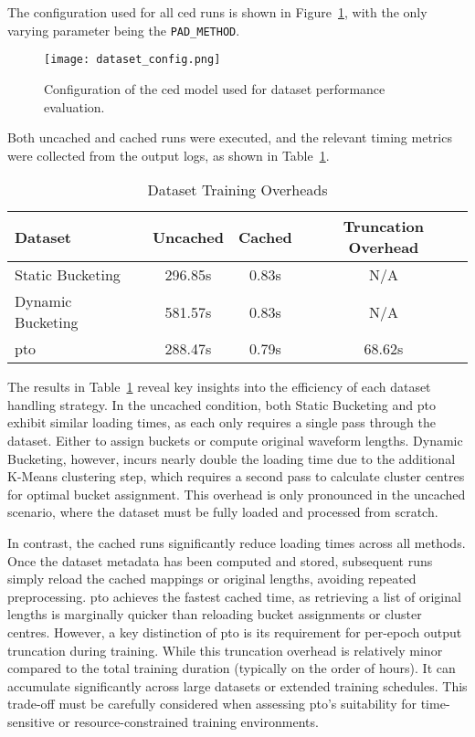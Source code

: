 The configuration used for all \gls{ced} runs is shown in Figure~\ref{fig:dataset_config}, with the only varying parameter being the \texttt{PAD\_METHOD}.

\begin{figure}[H]
    \centering
    \texttt{[image: dataset\_config.png]}
    \caption{\label{fig:dataset_config} Configuration of the \gls{ced} model used for dataset performance evaluation.}
\end{figure}

Both uncached and cached runs were executed, and the relevant timing metrics were collected from the output logs, as shown in Table~\ref{tab:dataset_loading_times}.

\vspace{1em}
\begin{table}[H]
\centering
\caption{Dataset Training Overheads}
\label{tab:dataset_loading_times}
\begin{tabular}{|l|c|c|c|}
\hline
\textbf{Dataset} & \textbf{Uncached} & \textbf{Cached} & \textbf{Truncation Overhead} \\
\hline
Static Bucketing  & 296.85s  & 0.83s   & N/A    \\
Dynamic Bucketing & 581.57s& 0.83s  & N/A    \\
\gls{pto}               & 288.47s & 0.79s  & 68.62s  \\
\hline
\end{tabular}
\end{table}

The results in Table~\ref{tab:dataset_loading_times} reveal key insights into the efficiency of each dataset handling strategy. In the uncached condition, both Static Bucketing and \gls{pto} exhibit similar loading times, as each only requires a single pass through the dataset. Either to assign buckets or compute original waveform lengths. Dynamic Bucketing, however, incurs nearly double the loading time due to the additional K-Means clustering step, which requires a second pass to calculate cluster centres for optimal bucket assignment. This overhead is only pronounced in the uncached scenario, where the dataset must be fully loaded and processed from scratch.

In contrast, the cached runs significantly reduce loading times across all methods. Once the dataset metadata has been computed and stored, subsequent runs simply reload the cached mappings or original lengths, avoiding repeated preprocessing. \gls{pto} achieves the fastest cached time, as retrieving a list of original lengths is marginally quicker than reloading bucket assignments or cluster centres. However, a key distinction of \gls{pto} is its requirement for per-epoch output truncation during training. While this truncation overhead is relatively minor compared to the total training duration (typically on the order of hours). It can accumulate significantly across large datasets or extended training schedules. This trade-off must be carefully considered when assessing \gls{pto}'s suitability for time-sensitive or resource-constrained training environments.

